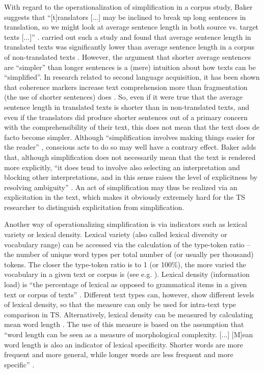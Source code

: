 With regard to the operationalization of simplification in a corpus study, Baker suggests that “[t]ranslators [...] may be inclined to break up long sentences in translation, so we might look at average sentence length in both source vs. target texts [...]” \citep[181]{baker_corpus-based_1996}. \citet{thelen_comparable_1996} carried out such a study and found that average sentence length in translated texts was significantly lower than average sentence length in a corpus of non-translated texts \citep[181]{baker_corpus-based_1996}. However, the argument that shorter average sentences are “simpler” than longer sentences is a (mere) intuition about how texts can be “simplified”. In research related to second language acquisition, it has been shown that coherence markers increase text comprehension more than fragmentation (the use of shorter sentences) does \citep{land_zwakke_2009}. So, even if it were true that the average sentence length in translated texts is shorter than in non-translated texts, and even if the translators did produce shorter sentences out of a primary concern with the comprehensibility of their text, this does not mean that the text does de facto become simpler. Although “simplification involves making things easier for the reader” \citep[182]{baker_corpus-based_1996}, conscious acts to do so may well have a contrary effect. Baker adds that, although simplification does not necessarily mean that the text is rendered more explicitly, “it does tend to involve also selecting an interpretation and blocking other interpretations, and in this sense raises the level of explicitness by resolving ambiguity” \citep[182]{baker_corpus-based_1996}. An act of simplification may thus be realized via an explicitation in the text, which makes it obviously extremely hard for the TS researcher to distinguish explicitation from simplification.

Another way of operationalizing simplification is via indicators such as lexical variety or lexical density. Lexical variety (also called lexical diversity or vocabulary range) can be accessed via the calculation of the type-token ratio – the number of unique word types per total number of (or usually per thousand) tokens. The closer the type-token ratio is to 1 (or 100\%), the more varied the vocabulary in a given text or corpus is (see e.g. \citealt{laviosa_core_1998}). Lexical density (information load) is “the percentage of lexical as opposed to grammatical items in a given text or corpus of texts” \citep[237]{baker_corpora_1995}. Different text types can, however, show different levels of lexical density, so that the measure can only be used for intra-text type comparison in TS. Alternatively, lexical density can be measured by calculating mean word length  \citep{Kruger2012}. The use of this measure is based on the assumption that “word length can be seen as a measure of morphological complexity. [...] [M]ean word length is also an indicator of lexical specificity. Shorter words are more frequent and more general, while longer words are less frequent and more specific” \citep[366]{Kruger2012}.

